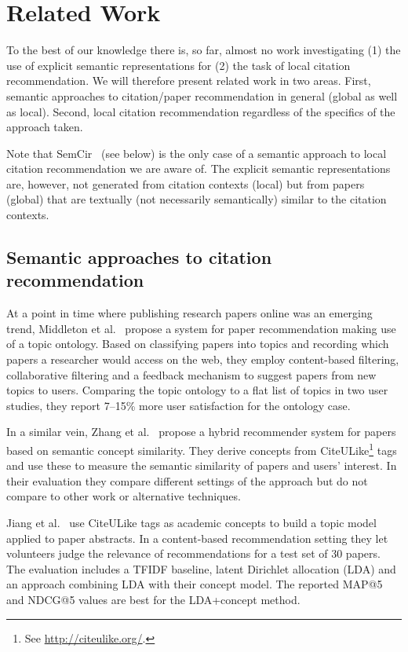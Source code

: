 \chapter{Related Work}\label{chap:relatedwork}

To the best of our knowledge there is, so far, almost no work investigating (1) the use of explicit semantic representations for (2) the task of local citation recommendation. We will therefore present related work in two areas. First, semantic approaches to citation/paper recommendation in general (global as well as local). Second, local citation recommendation regardless of the specifics of the approach taken.

Note that SemCir~\cite{Zarrinkalam2013} (see below) is the only case of a semantic approach to local citation recommendation we are aware of. The explicit semantic representations are, however, not generated from citation contexts (local) but from papers (global) that are textually (not necessarily semantically) similar to the citation contexts.

\section{Semantic approaches to citation recommendation}

At a point in time where publishing research papers online was an emerging trend, Middleton et al.~\cite{Middleton2001} propose a system for paper recommendation making use of a topic ontology. Based on classifying papers into topics and recording which papers a researcher would access on the web, they employ content-based filtering, collaborative filtering and a feedback mechanism to suggest papers from new topics to users. Comparing the topic ontology to a flat list of topics in two user studies, they report 7--15\% more user satisfaction for the ontology case.

In a similar vein, Zhang et al.~\cite{Zhang2008} propose a hybrid recommender system for papers based on semantic concept similarity. They derive concepts from CiteULike\footnote{See \url{http://citeulike.org/}.} tags and use these to measure the semantic similarity of papers and users' interest. In their evaluation they compare different settings of the approach but do not compare to other work or alternative techniques.

Jiang et al.~\cite{Jiang2012} use CiteULike tags as academic concepts to build a topic model applied to paper abstracts. In a content-based recommendation setting they let volunteers judge the relevance of recommendations for a test set of 30 papers. The evaluation includes a TFIDF baseline, latent Dirichlet allocation (LDA) and an approach combining LDA with their concept model. The reported MAP@5 and NDCG@5 values are best for the LDA+concept method.

